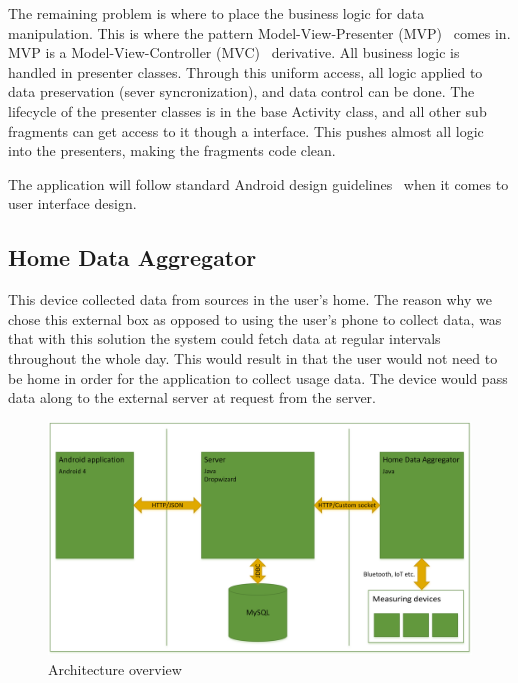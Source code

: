 The remaining problem is where to place the business logic for data manipulation. This is where the pattern Model-View-Presenter (MVP)~\cite{mvp} comes in. MVP is a Model-View-Controller (MVC)~\cite{mvc} derivative. All business logic is handled in presenter classes. Through this uniform access, all logic applied to data preservation (sever syncronization), and data control can be done. The lifecycle of the presenter classes is in the base Activity class, and all other sub fragments can get access to it though a interface. This pushes almost all logic into the presenters, making the fragments code clean.

The application will follow standard Android design guidelines~\cite{Androidgui}
when it comes to user interface design.

\subsection{Home Data Aggregator}
This device collected data from sources in the user's home. The reason why we chose this external box as opposed to using the user's phone to collect data, was that with this solution the system could fetch data at regular intervals throughout 
the whole day. This would result in that the user would not need to be home in order for the application to collect 
usage data. The device would pass data along to the external server at request from the server.

\begin{figure}[H]
\includegraphics[width=\textwidth]{ch/implementation/fig/architecture.png}
\caption{Architecture overview}
\end{figure}
